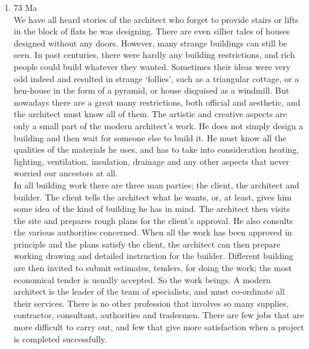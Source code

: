 \documentclass[12pt]{article}
\begin{document}
\begin{enumerate}
      Apart from this process of testing by results, any intelligent man will want to know the “reason why”. What connection can there be between a bowling dog and an approaching death? Can it be cause and effect? Can it be that the dog has a gift of foreseeing such events? Or is the dog the instrument employed by some uncanny power that moves invisibly in our midst? 

    \item 73 Ma\\
      We have all heard stories of the architect who forget to provide stairs or lifts in the block of flats he was designing. There are even sillier tales of houses designed without any doors. However, many strange buildings can still be seen. In past centuries, there were hardly any building restrictions, and rich people could build whatever they wanted. Sometimes their ideas were very odd indeed and resulted in strange `follies', such as a triangular cottage, or a hen-house in the form of a pyramid, or house disguised as a windmill. But nowadays there are a great many restrictions, both official and aesthetic, and the architect must know all of them. The artistic and creative aspects are only a small part of the modern architect's work. He does not simply design a building and then wait for someone else to build it. He must know all the qualities of the materials he uses, and has to take into consideration heating, lighting, ventilation, insulation, drainage and any other aspects that never worried our ancestors at all.\\

      In all building work there are three man parties; the client, the architect and builder. The client tells the architect what he wants, or, at least, gives him some idea of the kind of building he has in mind. The architect then visits the site and prepares rough plans for the client's approval. He also consults the various authorities concerned. When all the work has been approved in principle and the plans satisfy the client, the architect can then prepare working drawing and detailed instruction for the builder. Different building are then invited to submit estimates, tenders, for doing the work; the most economical tender is usually accepted. So the work beings. A modern architect is the leader of the team of specialists, and must co-ordinate all their services. There is no other profession that involves so many supplies, contractor, consultant, authorities and tradesmen. There are few jobs that are more difficult to carry out, and few that give more satisfaction when a project is completed successfully.


\end{enumerate}
\end{document}
